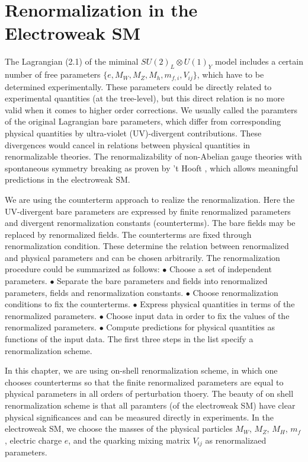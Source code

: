 \section{Renormalization in the Electroweak SM}
The Lagrangian (2.1) of the miminal $SU(2)_L\otimes U(1)_Y$ model includes a certain number of free parameters $\{e, M_W, M_Z, M_h, m_{f,i}, V_{ij} \}$, which have to be determined experimentally. These parameters could be directly related to experimental quantities (at the tree-level), but this direct relation is no more valid when it comes to higher order corrections. We usually called the paramters of the original Lagrangian bare parameters, which differ from corresponding physical quantities by ultra-violet (UV)-divergent contributions. 
These divergences would cancel in relations between physical quantities in renormalizable theories. The renormalizability of non-Abelian gauge theories with spontaneous symmetry breaking as proven by 't Hooft \cite{thooft1,thooft2}, which allows meaningful predictions in the electroweak SM.

We are using the counterterm approach to realize the renormalization. Here the UV-divergent bare parameters are expressed by finite renormalized parameters and divergent renormalization constants (counterterms). The bare fields may be replaced by renormalized fields. The counterterms are fixed through renormalization condition. These determine the relation between renormalized and physical parameters and can be chosen arbitrarily. The renormalization procedure could be summarized as follows:
\newline$\bullet$ \quad\quad Choose a set of independent parameters.
\newline$\bullet$ \quad\quad Separate the bare parameters and fields into renormalized parameters, fields and renormalization constants.
\newline$\bullet$ \quad\quad  Choose renormalization conditions to fix the counterterms.
\newline$\bullet$ \quad\quad Express physical quantities in terms of the renormalized parameters.
\newline$\bullet$ \quad\quad Choose input data in order to fix the values of the renormalized parameters.
\newline$\bullet$ \quad\quad Compute predictions for physical quantities as functions of the input data.
The first three steps in the list specify a renormalization scheme. 

In this chapter, we are using on-shell renormalization scheme, in which one chooses counterterms so that the finite renormalized parameters are equal to physical parameters in all orders of perturbation thoery. The beauty of on shell renormalization scheme is  that all paramters (of the electroweak SM) have clear physical significances and can be measured directly in experiments. In the electroweak SM, we choose the masses of the physical particles $M_W$, $M_Z$, $M_H$, $m_f$, electric charge $e$, and the quarking mixing matrix $V_{ij}$ as renormalizaed parameters.  


